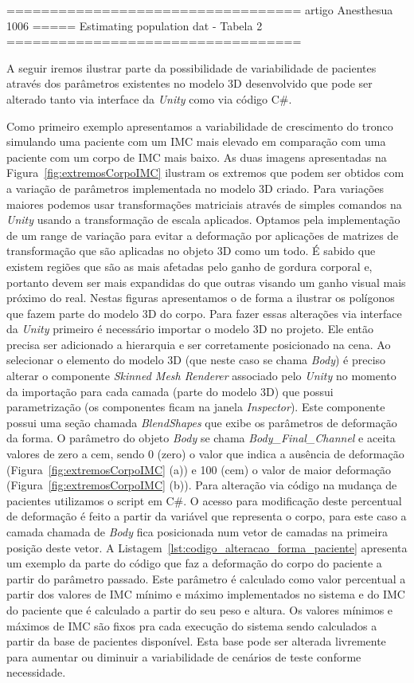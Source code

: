================================== artigo Anesthesua 1006 =====
Estimating population dat - Tabela 2
================================== 

A seguir iremos ilustrar parte da possibilidade de variabilidade de pacientes através dos parâmetros existentes no modelo 3D desenvolvido que pode ser alterado tanto via interface da \textit{Unity} como via código C\#. 

Como primeiro exemplo apresentamos a variabilidade de crescimento do tronco simulando uma paciente com um \acrshort{IMC} mais elevado em comparação com uma paciente com um corpo de \acrshort{IMC} mais baixo. As duas imagens apresentadas na Figura~\ref{fig:extremosCorpoIMC} ilustram os extremos que podem ser obtidos com a variação de parâmetros implementada no modelo 3D criado. Para variações maiores podemos usar transformações matriciais através de simples comandos na \textit{Unity} usando a transformação de escala aplicados. Optamos pela implementação de um range de variação para evitar a deformação por aplicações de matrizes de transformação que são aplicadas no objeto 3D como um todo. É sabido que existem regiões que são as mais afetadas pelo ganho de gordura corporal e, portanto devem ser mais expandidas do que outras visando um ganho visual mais próximo do real. Nestas figuras apresentamos o  de forma a ilustrar os polígonos que fazem parte do modelo 3D do corpo. Para fazer essas alterações via interface da \textit{Unity} primeiro é necessário importar o modelo 3D no projeto. Ele então precisa ser adicionado a hierarquia e ser corretamente posicionado na cena. Ao selecionar o elemento do modelo 3D (que neste caso se chama \textit{Body}) é preciso alterar o componente \textit{Skinned Mesh Renderer} associado pelo \textit{Unity} no momento da importação para cada camada (parte do modelo 3D) que possui parametrização (os componentes ficam na janela \textit{Inspector}). Este componente possui uma seção chamada \textit{BlendShapes} que exibe os parâmetros de deformação da forma. O parâmetro do objeto \textit{Body} se chama \textit{Body\_Final\_Channel} e aceita valores de zero a cem, sendo 0 (zero) o valor que indica a ausência de deformação (Figura~\ref{fig:extremosCorpoIMC} (a)) e 100 (cem) o valor de maior deformação (Figura~\ref{fig:extremosCorpoIMC} (b)). Para alteração via código na mudança de pacientes utilizamos o script em C\#. O acesso para modificação deste percentual de deformação é feito a partir da variável que representa o corpo, para este caso a camada chamada de \textit{Body} fica posicionada num vetor de camadas na primeira posição deste vetor. A Listagem~\ref{lst:codigo_alteracao_forma_paciente} apresenta um exemplo da parte do código que faz a deformação do corpo do paciente a partir do parâmetro passado. Este parâmetro é calculado como valor percentual a partir dos valores de \acrshort{IMC} mínimo e máximo implementados no sistema e do \acrshort{IMC} do paciente que é calculado a partir do seu peso e altura. Os valores mínimos e máximos de IMC são fixos pra cada execução do sistema sendo calculados a partir da base de pacientes disponível. Esta base pode ser alterada livremente para aumentar ou diminuir a variabilidade de cenários de teste conforme necessidade.

